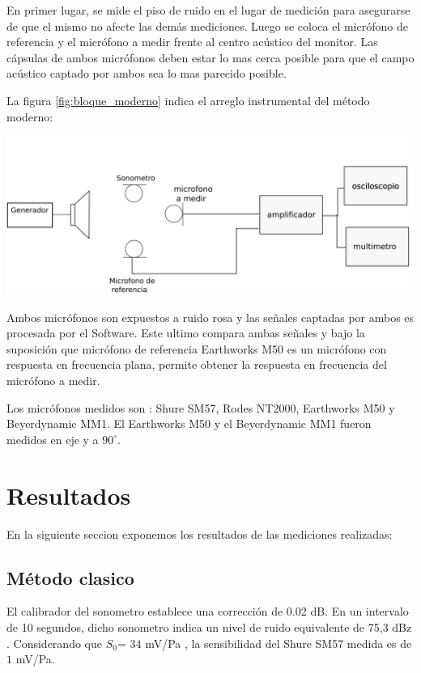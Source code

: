 \documentclass[]{article}
\makeatletter
\newenvironment{figurehere}   %
  {\def\@captype{figure}}   %
  {\par\medskip}
  {}              %
\makeatother
\begin{document}
\begin{multicols}{2}
En primer lugar, se mide el piso de ruido en el lugar de medición para asegurarse
de que el mismo no afecte las demás mediciones. Luego se coloca el micrófono de
referencia y el micrófono a medir frente al centro acústico del monitor.
Las cápsulas de ambos micrófonos deben estar lo mas cerca posible para que el
campo acústico captado por ambos sea lo mas parecido posible.

La figura \ref{fig:bloque_moderno} indica el arreglo instrumental del método
moderno:

\begin{figurehere}
 \centering
 \includegraphics[width=\linewidth]{blockdiag}
 \label{fig:bloque_clasico}
\end{figurehere}

Ambos micrófonos son expuestos a ruido rosa y las señales captadas por ambos
es procesada por el Software. Este ultimo compara ambas señales y bajo la
suposición que micrófono de referencia Earthworks M50 es un micrófono con
respuesta en frecuencia plana, permite obtener la respuesta en frecuencia del
micrófono a medir.

Los micrófonos medidos son : Shure SM57, Rodes NT2000, Earthworks M50 y
Beyerdynamic MM1. El Earthworks M50 y el Beyerdynamic MM1 fueron medidos en eje
y a $90^\circ$.

\section{Resultados}
En la siguiente seccion exponemos los resultados de las mediciones realizadas:
\subsection{Método clasico}

El calibrador del sonometro establece una corrección de 0.02 dB. En un intervalo
de 10 segundos, dicho sonometro indica un nivel de ruido equivalente de 75,3 dBz
. Considerando que $S_0$= $34$ mV/Pa , la sensibilidad del Shure SM57 medida es de
$1$ mV/Pa.


\end{multicols}
\end{document}
